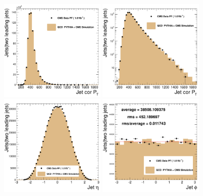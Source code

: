 \begin{figure}[!ht]
  \begin{center}
    \includegraphics[width=0.45\textwidth]{Figures/c_corPt_pf.pdf}
    \includegraphics[width=0.45\textwidth]{Figures/c_corPt_pf_log.pdf}
    \includegraphics[width=0.45\textwidth]{Figures/c_Eta_pf.pdf}
    \includegraphics[width=0.45\textwidth]{Figures/c_Phi_pf.pdf}

\end{center}
\end{figure}
